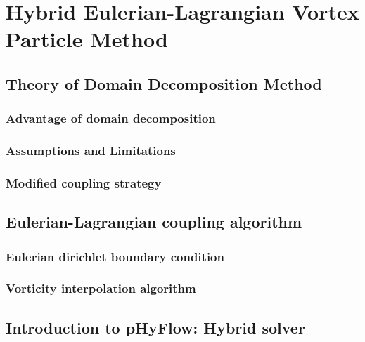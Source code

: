 \chapter{Hybrid Eulerian-Lagrangian Vortex Particle Method}
\label{ch:hybrid}

\section{Theory of Domain Decomposition Method}

\subsection{Advantage of domain decomposition}

\subsection{Assumptions and Limitations}

\subsection{Modified coupling strategy}

\section{Eulerian-Lagrangian coupling algorithm}

\subsection{Eulerian dirichlet boundary condition}

\subsection{Vorticity interpolation algorithm}

\section{Introduction to pHyFlow: Hybrid solver}

